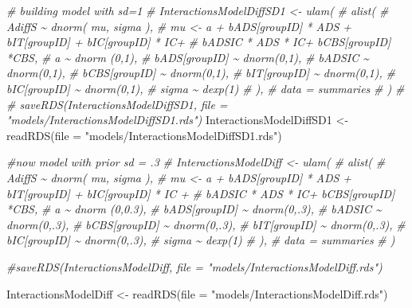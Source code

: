 \documentclass[
  10pt,
  dvipsnames,enabledeprecatedfontcommands]{scrartcl}
\newenvironment{Shaded}{\begin{snugshade}}{\end{snugshade}}
\newcommand{\AttributeTok}[1]{\textcolor[rgb]{0.77,0.63,0.00}{#1}}
\newcommand{\CommentTok}[1]{\textcolor[rgb]{0.56,0.35,0.01}{\textit{#1}}}
\newcommand{\FunctionTok}[1]{\textcolor[rgb]{0.00,0.00,0.00}{#1}}
\newcommand{\NormalTok}[1]{#1}
\newcommand{\OtherTok}[1]{\textcolor[rgb]{0.56,0.35,0.01}{#1}}
\newcommand{\StringTok}[1]{\textcolor[rgb]{0.31,0.60,0.02}{#1}}
\begin{document}
\begin{Shaded}
\begin{Highlighting}[]
\CommentTok{\# building model with sd=1}
\CommentTok{\# InteractionsModelDiffSD1 \textless{}{-} ulam(}
\CommentTok{\#   alist(}
\CommentTok{\#     AdiffS \textasciitilde{} dnorm( mu, sigma ),}
\CommentTok{\#     mu \textless{}{-} a + bADS[groupID] * ADS +  bIT[groupID] + bIC[groupID] * IC+}
\CommentTok{\#     bADSIC * ADS * IC+ bCBS[groupID] *CBS,}
\CommentTok{\#     a \textasciitilde{} dnorm (0,1),}
\CommentTok{\#     bADS[groupID] \textasciitilde{} dnorm(0,1),}
\CommentTok{\#     bADSIC \textasciitilde{} dnorm(0,1),}
\CommentTok{\#     bCBS[groupID] \textasciitilde{} dnorm(0,1),}
\CommentTok{\#     bIT[groupID] \textasciitilde{} dnorm(0,1),}
\CommentTok{\#     bIC[groupID] \textasciitilde{} dnorm(0,1),}
\CommentTok{\#     sigma  \textasciitilde{} dexp(1)}
\CommentTok{\#   ), }
\CommentTok{\#   data = summaries}
\CommentTok{\# )}
\CommentTok{\# }
\CommentTok{\# saveRDS(InteractionsModelDiffSD1, file = "models/InteractionsModelDiffSD1.rds")}
\NormalTok{InteractionsModelDiffSD1 }\OtherTok{\textless{}{-}} \FunctionTok{readRDS}\NormalTok{(}\AttributeTok{file =} \StringTok{"models/InteractionsModelDiffSD1.rds"}\NormalTok{)}


\CommentTok{\#now model with prior sd = .3}
\CommentTok{\# InteractionsModelDiff \textless{}{-} ulam(}
\CommentTok{\#   alist(}
\CommentTok{\#     AdiffS \textasciitilde{} dnorm( mu, sigma ),}
\CommentTok{\#     mu \textless{}{-} a + bADS[groupID] * ADS +  bIT[groupID] + bIC[groupID] * IC +}
\CommentTok{\#     bADSIC * ADS * IC+ bCBS[groupID] *CBS,}
\CommentTok{\#     a \textasciitilde{} dnorm (0,0.3),}
\CommentTok{\#     bADS[groupID] \textasciitilde{} dnorm(0,.3),}
\CommentTok{\#     bADSIC \textasciitilde{} dnorm(0,.3),}
\CommentTok{\#     bCBS[groupID] \textasciitilde{} dnorm(0,.3),}
\CommentTok{\#     bIT[groupID] \textasciitilde{} dnorm(0,.3),}
\CommentTok{\#     bIC[groupID] \textasciitilde{} dnorm(0,.3),}
\CommentTok{\#     sigma  \textasciitilde{} dexp(1)}
\CommentTok{\#   ), }
\CommentTok{\#   data = summaries}
\CommentTok{\# )}

\CommentTok{\#saveRDS(InteractionsModelDiff, file = "models/InteractionsModelDiff.rds")}

\NormalTok{InteractionsModelDiff }\OtherTok{\textless{}{-}} \FunctionTok{readRDS}\NormalTok{(}\AttributeTok{file =} \StringTok{"models/InteractionsModelDiff.rds"}\NormalTok{)}


\end{Highlighting}
\end{Shaded}
\end{document}
